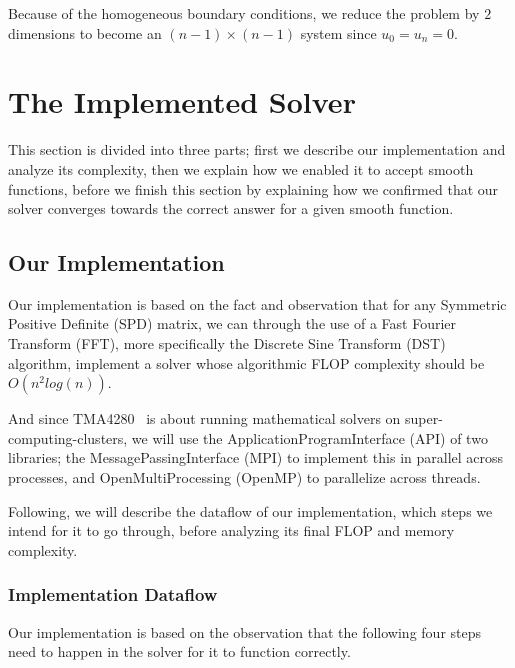 \documentclass[fontsize=11pt,paper=a4,titlepage]{article}
\begin{document}
Because of the homogeneous boundary conditions, we reduce the problem by $2$
dimensions to become an $(n - 1) \times (n - 1)$ system since $u_0 = u_n = 0$.

\section{The Implemented Solver}

This section is divided into three parts; first we describe our implementation
and analyze its complexity, then we explain how we enabled it to accept smooth
functions, before we finish this section by explaining how we confirmed that our
solver converges towards the correct answer for a given smooth function.

\subsection{Our Implementation}
\label{sec:Impl}

Our implementation is based on the fact and observation that for any Symmetric
Positive Definite (SPD) matrix, we can through the use of a Fast Fourier
Transform (FFT), more specifically the Discrete Sine Transform (DST)
algorithm, implement a solver whose algorithmic FLOP complexity should be
$\textit{O}(n^2log(n))$.

And since TMA4280~\cite{tma4280} is about running mathematical solvers on
super-computing-clusters, we will use the ApplicationProgramInterface (API)
of two libraries; the MessagePassingInterface (MPI) to implement this in
parallel across processes, and OpenMultiProcessing (OpenMP) to parallelize
across threads.

Following, we will describe the dataflow of our implementation, which steps we
intend for it to go through, before analyzing its final FLOP and memory
complexity.

\subsubsection{Implementation Dataflow}
\label{sssec:dataflow}

Our implementation is based on the observation that the following four steps
need to happen in the solver for it to function correctly.
\end{document}
